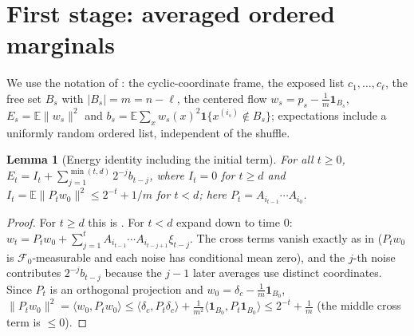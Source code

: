 \documentclass[11pt]{amsart}
\newtheorem{lemma}[theorem]{Lemma}
\theoremstyle{remark}
\newcommand{\E}{\mathbb E}
\begin{document}
\section{First stage: averaged ordered marginals}
We use the notation of \cite[Sections 2--3]{oai-thorp}: the cyclic-coordinate frame, the exposed list
$c_1,\dots,c_\ell$, the free set $B_s$ with $|B_s|=m=n-\ell$, the centered flow
$w_s=p_s-\frac1m\mathbf 1_{B_s}$, $E_s=\E\|w_s\|^2$ and $b_s=\E\sum_xw_s(x)^2\mathbf 1\{x^{(i_s)}\notin B_s\}$;
expectations include a uniformly random ordered list, independent of the shuffle.

\begin{lemma}[Energy identity including the initial term]\label{lem:identity}
For all $t\ge0$, $E_t=I_t+\sum_{j=1}^{\min(t,d)}2^{-j}b_{t-j}$, where $I_t=0$ for $t\ge d$ and
$I_t=\E\|P_tw_0\|^2\le2^{-t}+1/m$ for $t<d$; here $P_t=A_{i_{t-1}}\cdots A_{i_0}$.
\end{lemma}
\begin{proof}
For $t\ge d$ this is \cite[Lemma~3.2]{oai-thorp}. For $t<d$ expand \cite[(3.1)]{oai-thorp} down to
time $0$: $w_t=P_tw_0+\sum_{j=1}^{t}A_{i_{t-1}}\cdots A_{i_{t-j+1}}\xi_{t-j}$. The cross terms vanish exactly as in
\cite[Lemma~3.2]{oai-thorp} ($P_tw_0$ is $\mathcal F_0$-measurable and each noise has conditional mean
zero), and the $j$-th noise contributes $2^{-j}b_{t-j}$ because the $j-1$ later averages use distinct
coordinates. Since $P_t$ is an orthogonal projection and $w_0=\delta_{c}-\frac1m\mathbf 1_{B_0}$,
$\|P_tw_0\|^2=\langle w_0,P_tw_0\rangle\le\langle\delta_c,P_t\delta_c\rangle+\frac1{m^2}\langle\mathbf 1_{B_0},P_t\mathbf 1_{B_0}\rangle\le2^{-t}+\frac1m$
(the middle cross term is $\le0$).
\end{proof}
\end{document}
